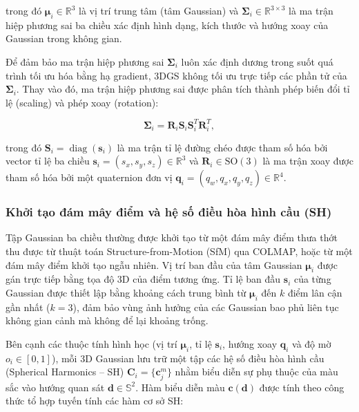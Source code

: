 trong đó $\boldsymbol{\mu}_i \in \mathbb{R}^3$ là vị trí trung tâm (tâm Gaussian) và $\boldsymbol{\Sigma}_i \in \mathbb{R}^{3 \times 3}$ là ma trận hiệp phương sai ba chiều xác định hình dạng, kích thước và hướng xoay của Gaussian trong không gian.

Để đảm bảo ma trận hiệp phương sai $\boldsymbol{\Sigma}_i$ luôn xác định dương trong suốt quá trình tối ưu hóa bằng hạ gradient, 3DGS không tối ưu trực tiếp các phần tử của $\boldsymbol{\Sigma}_i$. Thay vào đó, ma trận hiệp phương sai được phân tích thành phép biến đổi tỉ lệ (scaling) và phép xoay (rotation):

\begin{equation}
    \boldsymbol{\Sigma}_i
    =
    \mathbf{R}_i
    \mathbf{S}_i
    \mathbf{S}_i^{T}
    \mathbf{R}_i^{T},
    \label{eq:3dgs-covariance-factorization}
\end{equation}

trong đó $\mathbf{S}_i = \operatorname{diag}(\mathbf{s}_i)$ là ma trận tỉ lệ đường chéo được tham số hóa bởi vector tỉ lệ ba chiều $\mathbf{s}_i = (s_x, s_y, s_z) \in \mathbb{R}^3$ và $\mathbf{R}_i \in \mathrm{SO}(3)$ là ma trận xoay được tham số hóa bởi một quaternion đơn vị $\mathbf{q}_i = (q_w, q_x, q_y, q_z) \in \mathbb{R}^4$. 

\subsubsection{Khởi tạo đám mây điểm và hệ số điều hòa hình cầu (SH)}
\label{subsubsec:3dgs-initialization-sh}

Tập Gaussian ba chiều thường được khởi tạo từ một đám mây điểm thưa thớt thu được từ thuật toán Structure-from-Motion (SfM) qua COLMAP, hoặc từ một đám mây điểm khởi tạo ngẫu nhiên. Vị trí ban đầu của tâm Gaussian $\boldsymbol{\mu}_i$ được gán trực tiếp bằng tọa độ 3D của điểm tương ứng. Tỉ lệ ban đầu $\mathbf{s}_i$ của từng Gaussian được thiết lập bằng khoảng cách trung bình từ $\boldsymbol{\mu}_i$ đến $k$ điểm lân cận gần nhất ($k=3$), đảm bảo vùng ảnh hưởng của các Gaussian bao phủ liên tục không gian cảnh mà không để lại khoảng trống.

Bên cạnh các thuộc tính hình học (vị trí $\boldsymbol{\mu}_i$, tỉ lệ $\mathbf{s}_i$, hướng xoay $\mathbf{q}_i$ và độ mờ $o_i \in [0,1]$), mỗi 3D Gaussian lưu trữ một tập các hệ số điều hòa hình cầu (Spherical Harmonics -- SH) $\mathbf{C}_i = \{ \mathbf{c}_j^m \}$ nhằm biểu diễn sự phụ thuộc của màu sắc vào hướng quan sát $\mathbf{d} \in \mathbb{S}^2$. Hàm biểu diễn màu $\mathbf{c}(\mathbf{d})$ được tính theo công thức tổ hợp tuyến tính các hàm cơ sở SH:


